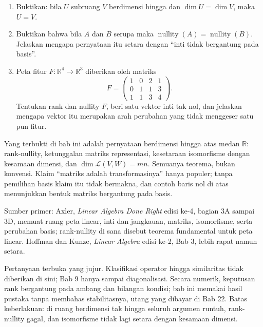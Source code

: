 \begin{latihan}
\begin{enumerate}
  \item Buktikan: bila $U$ subruang $V$ berdimensi hingga dan $\dim U=\dim V$, maka $U=V$.

  \item Buktikan bahwa bila $A$ dan $B$ serupa maka $\operatorname{nullity}(A)
        =\operatorname{nullity}(B)$. Jelaskan mengapa pernyataan itu setara dengan
        ``inti tidak bergantung pada basis''.

  \item Peta fitur $F\colon\mathbb{R}^{4}\to\mathbb{R}^{3}$ diberikan oleh matriks
        \[
          F=\begin{pmatrix}1&0&2&1\\ 0&1&1&3\\ 1&1&3&4\end{pmatrix}.
        \]
        Tentukan rank dan nullity $F$, beri satu vektor inti tak nol, dan jelaskan mengapa
        vektor itu merupakan arah perubahan yang tidak menggeser satu pun fitur.
\end{enumerate}
\end{latihan}

\begin{untukpeneliti}
Yang terbukti di bab ini adalah pernyataan berdimensi hingga atas medan $\mathbb{R}$:
rank-nullity, ketunggalan matriks representasi, kesetaraan isomorfisme dengan kesamaan
dimensi,
dan $\dim\mathcal{L}(V,W)=mn$. Semuanya teorema, bukan konvensi. Klaim ``matriks adalah
transformasinya'' hanya populer; tanpa pemilihan basis klaim itu tidak bermakna, dan contoh
baris
nol di atas menunjukkan bentuk matriks bergantung pada basis.

Sumber primer: Axler, \emph{Linear Algebra Done Right} edisi ke-4, bagian 3A sampai 3D,
memuat
ruang peta linear, inti dan jangkauan, matriks, isomorfisme, serta perubahan basis;
rank-nullity
di sana disebut teorema fundamental untuk peta linear. Hoffman dan Kunze, \emph{Linear
Algebra}
edisi ke-2, Bab 3, lebih rapat namun setara.

Pertanyaan terbuka yang jujur. Klasifikasi operator hingga similaritas tidak diberikan di
sini; Bab 9 hanya sampai diagonalisasi. Secara numerik, keputusan rank bergantung pada
ambang dan
bilangan kondisi; bab ini memakai hasil pustaka tanpa membahas stabilitasnya, utang yang
dibayar
di Bab 22. Batas keberlakuan: di ruang berdimensi tak hingga seluruh argumen runtuh,
rank-nullity
gagal, dan isomorfisme tidak lagi setara dengan kesamaan dimensi.
\end{untukpeneliti}

